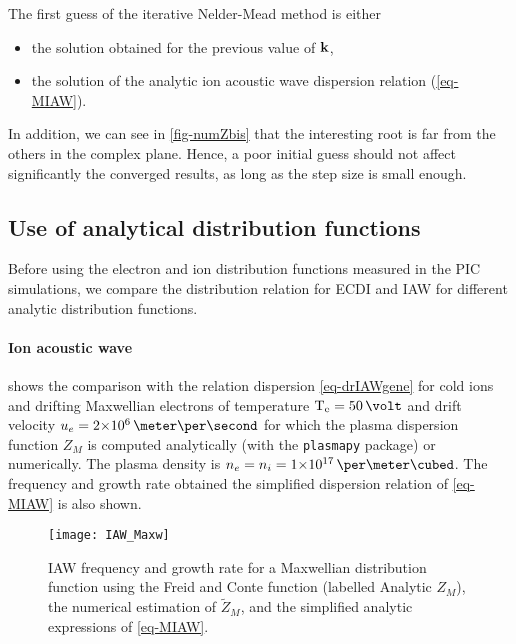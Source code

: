    The first guess of the iterative Nelder-Mead method is either 
    \begin{itemize}
      \item the solution obtained for the previous value of ${\mathbf k}$, 
      \item the solution of the analytic ion acoustic wave dispersion relation (\cref{eq-MIAW}).
    \end{itemize}
    In addition, we can see in \cref{fig-numZbis} that the interesting root is far from the others in the complex plane.
    Hence, a poor initial guess should not affect significantly the converged results, as long as the step size is small enough.
    


\subsection{Use of analytical distribution functions} \label{subsec-DRimpact}
  Before using the electron and ion distribution functions measured in the \ac{PIC} simulations, we compare the distribution relation for \ac{ECDI} and \ac{IAW} for different analytic distribution functions.
  
  \paragraph{Ion acoustic wave\\}
  
   shows the comparison with the relation dispersion \cref{eq-drIAWgene} for cold ions and drifting Maxwellian electrons of temperature $\Te=50\,\volt$ and drift velocity $u_e = \sn{2}{6} \,\meter\per\second$ for which the plasma dispersion function $Z_M$ is computed analytically (with the \texttt{plasmapy} package) or numerically.
  The plasma density is $n_e = n_i = \sn{1}{17} \,\per\meter\cubed$.
  The frequency and growth rate obtained the simplified dispersion relation of \cref{eq-MIAW} is also shown. 
  
  \begin{figure}[hbt]
    \centering
    \texttt{[image: IAW\_Maxw]}
    \caption{\ac{IAW} frequency and growth rate for a Maxwellian distribution function using the Freid and Conte function (labelled Analytic $Z_M$), the numerical estimation of $\tilde{Z}_M$, and the simplified analytic expressions of \cref{eq-MIAW}. }
    \label{fig-IAW_Maxw}
  \end{figure}
  
